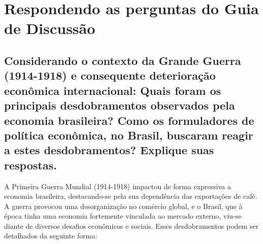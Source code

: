\documentclass[a4paper,12pt]{article}[abntex2]
\begin{document}
\newpage
\section{\textbf{Respondendo as perguntas do Guia de Discussão}}
\subsection{\textbf{Considerando o contexto da Grande Guerra (1914-1918) e consequente deterioração econômica internacional: Quais foram os principais desdobramentos observados pela economia brasileira? Como os formuladores de política econômica, no Brasil, buscaram reagir a estes desdobramentos? Explique suas respostas.}}

A Primeira Guerra Mundial (1914-1918) impactou de forma expressiva a economia brasileira, destacando-se pela sua dependência das exportações de café. A guerra provocou uma desorganização no comércio global, e o Brasil, que à época tinha uma economia fortemente vinculada ao mercado externo, viu-se diante de diversos desafios econômicos e sociais. Esses desdobramentos podem ser detalhados da seguinte forma:
\end{document}
